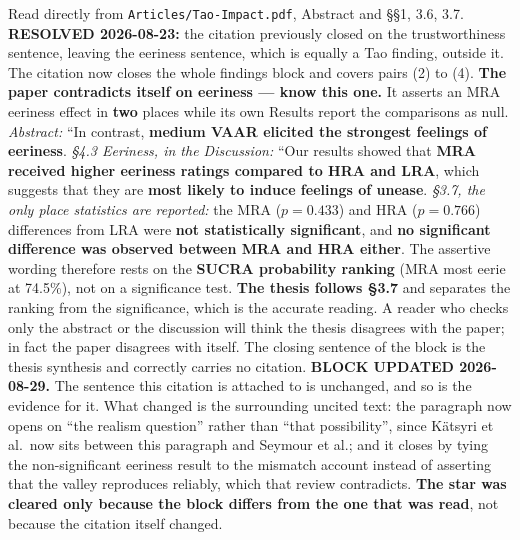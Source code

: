 \documentclass[11pt, a4paper]{article}
\begin{document}
\begin{Form}
  {Read directly from \texttt{\footnotesize Articles/Tao-Impact.pdf}, Abstract and \S\S1, 3.6, 3.7. \textbf{RESOLVED 2026-08-23:} the citation previously closed on the trustworthiness sentence, leaving the eeriness sentence, which is equally a Tao finding, outside it. The citation now closes the whole findings block and covers pairs (2) to (4). \textbf{The paper contradicts itself on eeriness --- know this one.} It asserts an MRA eeriness effect in \textbf{two} places while its own Results report the comparisons as null. \emph{Abstract:} ``In contrast, \textbf{medium VAAR elicited the strongest feelings of eeriness}. \emph{\S4.3 Eeriness, in the Discussion:} ``Our results showed that \textbf{MRA received higher eeriness ratings compared to HRA and LRA}, which suggests that they are \textbf{most likely to induce feelings of unease}. \emph{\S3.7, the only place statistics are reported:} the MRA ($p = 0.433$) and HRA ($p = 0.766$) differences from LRA were \textbf{not statistically significant}, and \textbf{no significant difference was observed between MRA and HRA either}. The assertive wording therefore rests on the \textbf{SUCRA probability ranking} (MRA most eerie at 74.5\%), not on a significance test. \textbf{The thesis follows \S3.7} and separates the ranking from the significance, which is the accurate reading. A reader who checks only the abstract or the discussion will think the thesis disagrees with the paper; in fact the paper disagrees with itself. The closing sentence of the block is the thesis synthesis and correctly carries no citation. \textbf{BLOCK UPDATED 2026-08-29.} The sentence this citation is attached to is unchanged, and so is the evidence for it. What changed is the surrounding uncited text: the paragraph now opens on ``the realism question'' rather than ``that possibility'', since K\"{a}tsyri et al.\ now sits between this paragraph and Seymour et al.; and it closes by tying the non-significant eeriness result to the mismatch account instead of asserting that the valley reproduces reliably, which that review contradicts. \textbf{The star was cleared only because the block differs from the one that was read}, not because the citation itself changed.}



\end{Form}
\end{document}
